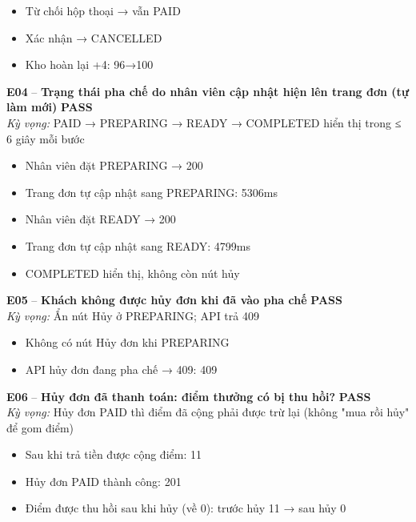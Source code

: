 \documentclass[a4paper,11pt]{article}
\newcommand{\ok}{\textcolor{okgreen}{\textbf{PASS}}}
\begin{document}
\begin{itemize}\footnotesize
\item \tick Từ chối hộp thoại → vẫn PAID
\item \tick Xác nhận → CANCELLED
\item \tick Kho hoàn lại +4: 96→100
\end{itemize}
\begin{minipage}{\textwidth}\vspace{4pt}\textbf{\textcolor{brew}{E04}} -- \textbf{Trạng thái pha chế do nhân viên cập nhật hiện lên trang đơn (tự làm mới)} \hfill \ok\\
{\small\emph{Kỳ vọng:} PAID → PREPARING → READY → COMPLETED hiển thị trong ≤ 6 giây mỗi bước}
\end{minipage}
\begin{itemize}\footnotesize
\item \tick Nhân viên đặt PREPARING → 200
\item \tick Trang đơn tự cập nhật sang PREPARING: 5306ms
\item \tick Nhân viên đặt READY → 200
\item \tick Trang đơn tự cập nhật sang READY: 4799ms
\item \tick COMPLETED hiển thị, không còn nút hủy
\end{itemize}
\begin{minipage}{\textwidth}\vspace{4pt}\textbf{\textcolor{brew}{E05}} -- \textbf{Khách không được hủy đơn khi đã vào pha chế} \hfill \ok\\
{\small\emph{Kỳ vọng:} Ẩn nút Hủy ở PREPARING; API trả 409}
\end{minipage}
\begin{itemize}\footnotesize
\item \tick Không có nút Hủy đơn khi PREPARING
\item \tick API hủy đơn đang pha chế → 409: 409
\end{itemize}
\begin{minipage}{\textwidth}\vspace{4pt}\textbf{\textcolor{brew}{E06}} -- \textbf{Hủy đơn đã thanh toán: điểm thưởng có bị thu hồi?} \hfill \ok\\
{\small\emph{Kỳ vọng:} Hủy đơn PAID thì điểm đã cộng phải được trừ lại (không "mua rồi hủy" để gom điểm)}
\end{minipage}
\begin{itemize}\footnotesize
\item \tick Sau khi trả tiền được cộng điểm: 11
\item \tick Hủy đơn PAID thành công: 201
\item \tick Điểm được thu hồi sau khi hủy (về 0): trước hủy 11 → sau hủy 0
\end{itemize}
\end{document}
